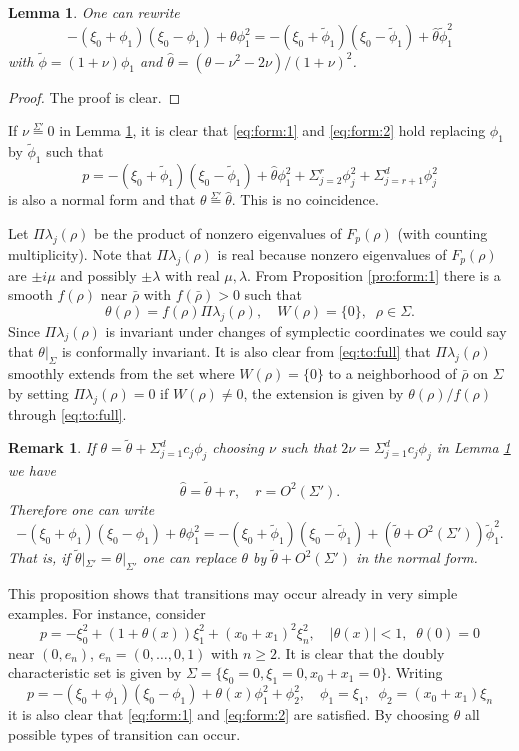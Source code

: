 \documentclass[12pt,leqno]{article} %
\def\sieq{\overset{\Sigma'}{=}}
\def\bro{\bar\rho}
\def\bro{\bar\rho}
\numberwithin{equation}{section}
\newtheorem{remark}{Remark}[section]
\newtheorem{lem}{Lemma}[section]
\begin{document}
%
\begin{lem}
\label{lem:kakikae}One can rewrite
%
\[
-(\xi_0+\phi_1)(\xi_0-\phi_1)+\theta\phi_1^2=-(\xi_0+\tilde\phi_1)(\xi_0-\tilde\phi_1)+\hat\theta\tilde\phi_1^2
\]
%
with $
\tilde\phi=(1+\nu)\phi_1$ and $ \hat\theta=(\theta-\nu^2-2\nu)/(1+\nu)^2$.
\end{lem}
%
\begin{proof} The proof is clear.
\end{proof}
%
If $\nu\sieq 0$ in Lemma \ref{lem:kakikae}, it is clear that \eqref{eq:form:1} and \eqref{eq:form:2} hold replacing $\phi_1$ by $\tilde \phi_1$ such that
%
\[
p=-(\xi_0+\tilde\phi_1)(\xi_0-\tilde \phi_1)+\hat\theta\phi_1^2+\Sigma_{j=2}^r\phi_j^2+\Sigma_{j=r+1}^d\phi_j^2
\]
%
is also a normal form and that $\theta\sieq \hat\theta$. This is no
coincidence.

Let $\Pi\lambda_j(\rho)$ be the product of nonzero eigenvalues of $F_p(\rho)$ (with counting multiplicity). Note that $\Pi\lambda_j(\rho)$ is real because nonzero eigenvalues of $F_p(\rho)$ are $\pm i\mu$ and possibly $\pm \lambda$ with real $\mu, \lambda$. From Proposition \ref{pro:form:1} there is a smooth $f(\rho)$ near $\bro$ with $f(\bro)>0$ such that 
%
\begin{equation}
\label{eq:to:full}
\theta(\rho)=f(\rho)\Pi \lambda_j(\rho),\quad W(\rho)=\{0\},\;\;\rho\in \Sigma.
\end{equation}
%
Since $\Pi \lambda_j(\rho)$ is invariant under changes of symplectic coordinates we could say that $\theta|_{\Sigma}$ is conformally invariant. It is also clear from \eqref{eq:to:full} that $\Pi \lambda_j(\rho)$ smoothly extends from the set where $W(\rho)=\{0\}$ to a neighborhood of $\bro$ on $\Sigma$ by setting $\Pi \lambda_j(\rho)=0$ if $W(\rho)\neq0$, the extension is given by $\theta(\rho)/f(\rho)$ through \eqref{eq:to:full}.
%
%
%
\begin{remark}
\label{rem:O:4}\rm
If $
\theta=\tilde\theta+\Sigma_{j=1}^dc_j\phi_j$
choosing $\nu$ such that  $2\nu=\Sigma_{j=1}^dc_j\phi_j$ in Lemma \ref{lem:kakikae} we have
%
\[
\hat\theta=\tilde\theta+r,\quad r=O^2(\Sigma').
\]
%
Therefore one can write
%
\[
-(\xi_0+\phi_1)(\xi_0-\phi_1)+\theta\phi_1^2=-(\xi_0+\tilde\phi_1)(\xi_0-\tilde\phi_1)+(\tilde\theta+O^2(\Sigma'))\tilde\phi_1^2.
\]
%
That is, if $\tilde\theta|_{\Sigma'}=\theta|_{\Sigma'}$ one can replace $\theta$ by $\tilde\theta+O^2(\Sigma')$  in the normal form.
\end{remark}
%
%
%
This proposition shows that transitions may occur already in very simple examples. For instance, consider
%
\[
p=-\xi_0^2+(1+\theta(x))\xi_1^2+(x_0+x_1)^2\xi_n^2,\quad |\theta(x)|<1,\;\;\theta(0)=0 
\]
%
near $(0, e_n)$, $e_n=(0,\ldots,0,1)$ with $n\geq 2$. It is clear that the doubly characteristic set is given by $
\Sigma=\{\xi_0=0,\xi_1=0, x_0+x_1=0\}$. Writing 
%
\begin{equation}
\label{eq:rei:1}
p=-(\xi_0+\phi_1)(\xi_0-\phi_1)+\theta(x)\phi_1^2+\phi_2^2,\quad \phi_1=\xi_1,\;\;\phi_2=(x_0+x_1)\xi_n
\end{equation}
%
it is also clear that \eqref{eq:form:1} and \eqref{eq:form:2} are satisfied. By choosing $\theta$ all possible types of transition can occur.
%
\end{document}
